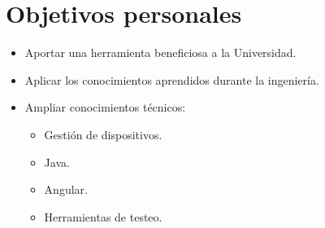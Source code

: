 \section{Objetivos personales}\label{sec:objetivos-personales}
    \begin{itemize}
        \item Aportar una herramienta beneficiosa a la Universidad.
        \item Aplicar los conocimientos aprendidos durante la ingeniería.
        \item Ampliar conocimientos técnicos:
        \begin{itemize}
                  \item Gestión de dispositivos.
                  \item Java.
                  \item Angular.
                  \item Herramientas de testeo.
        \end{itemize}
    \end{itemize}